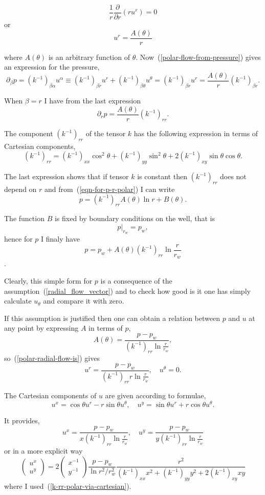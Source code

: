 \documentclass{article}
\def\eqn#1{\begin{displaymath}#1\end{displaymath}}
\def\eqnl#1#2{\begin{equation}\label{#1}#2\end{equation}}
\def\rf#1{(\ref{#1})}
\theoremstyle{marginbreak} \theorembodyfont{\itshape}
\begin{document}
\eqn{ \frac{1}{r}\frac{\partial}{\partial r} (ru^r) = 0 }
or
\eqnl{polar-radial-flow-is}{u^r = \frac{A(\theta)}{r}}

where $A(\theta)$ is an arbitrary function of $\theta$.
Now~\rf{polar-flow-from-pressure} gives an expression for the pressure,
\eqn{
\partial_{\beta} p
= (k^{-1})_{\beta\alpha}u^\alpha
\equiv (k^{-1})_{\beta r}u^r +  (k^{-1})_{\beta\theta}u^\theta
= (k^{-1})_{\beta r}u^r = \frac{A(\theta)}{r} (k^{-1})_{\beta r}.
}
\par
When $\beta=r$ I have from the last expression
\eqnl{eqn-for-p-r-polar}{
\partial_{r} p = \frac{A(\theta)}{r} (k^{-1})_{rr}.
}

\par
The component $(k^{-1})_{rr}$ of the tensor $k$ has the following expression
in terms of Cartesian components,
\eqnl{k-rr-polar-via-cartesian}{
(k^{-1})_{rr} = (k^{-1})_{xx} \cos^2\theta + (k^{-1})_{yy} \sin^2\theta
+ 2(k^{-1})_{xy} \sin\theta\cos\theta .
}

The last expression shows that if tensor $k$ is constant then
$(k^{-1})_{rr}$ does not depend on $r$ and from~\rf{eqn-for-p-r-polar}
I can write
\eqn{
p = (k^{-1})_{rr}A(\theta) \ln{r} + B(\theta) .
}

The function $B$ is fixed by boundary conditions on the well,
that is
\eqn{ p|_{r_w} = p_w, }
hence for $p$ I finaly have
\eqn{ p = p_w + A(\theta) (k^{-1})_{rr} \ln{\frac{r}{r_w}}}.

\par
Clearly, this simple form for $p$ is a consequence
of the assumption~\rf{radial_flow_vector} and to check how good is it
one has simply calculate $u_\theta$ and compare it with zero.

\par
If this assumption is justified then one can obtain a relation between
$p$ and $u$ at any point by expressing $A$ in terms of $p$,
\eqn{
A(\theta) = \frac{p-p_w}{(k^{-1})_{rr} \ln{\frac{r}{r_w}}},
}
so~\rf{polar-radial-flow-is} gives
\eqnl{u-in-term-p}{
    u^r = \frac{p-p_w}{(k^{-1})_{rr} r\ln{\frac{r}{r_w}}},
    \quad u^\theta=0.
}
\par
The Cartesian components of $u$ are given according to formulae,
\eqn{
u^x = \cos\theta u^r -r \sin\theta u^\theta,
\quad
u^y = \sin\theta u^r +r \cos\theta u^\theta.
}

It provides,
\eqn{
u^x = \frac{p-p_w}{x(k^{-1})_{rr}\ln{\frac{r}{r_w}}},
\quad
u^y = \frac{p-p_w}{y(k^{-1})_{rr}\ln{\frac{r}{r_w}}}
}
or in a more explicit way
\eqn{
\begin{pmatrix}u^x \\ u^y \end{pmatrix}
= 2 \begin{pmatrix} x^{-1} \\ y^{-1} \end{pmatrix}
\frac{p-p_w}{\ln{{r^2}/{r_w^2}}}
\frac{r^2}{(k^{-1})_{xx}x^2 + (k^{-1})_{yy}y^2 + 2(k^{-1})_{xy}xy}
}
where I used~\rf{k-rr-polar-via-cartesian}.
\end{document}
